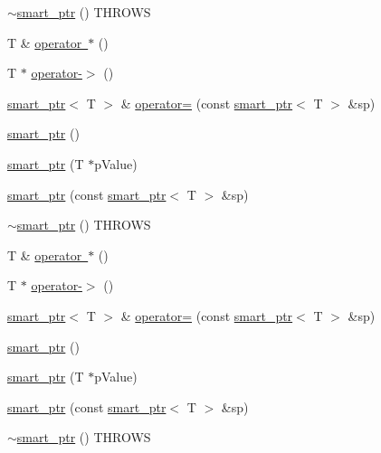 \begin{DoxyCompactItemize}
\mbox{\hyperlink{classfakeit_1_1smart__ptr_a0a184c081564a5a22d8ad0a121614bc5}{$\sim$smart\+\_\+ptr}} () T\+H\+R\+O\+WS
\item 
T \& \mbox{\hyperlink{classfakeit_1_1smart__ptr_a6ad907f45c59a2519248f5a79191992e}{operator $\ast$}} ()
\item 
T $\ast$ \mbox{\hyperlink{classfakeit_1_1smart__ptr_aa9b3019d80eee2f376a9b92ef8080ffc}{operator-\/$>$}} ()
\item 
\mbox{\hyperlink{classfakeit_1_1smart__ptr}{smart\+\_\+ptr}}$<$ T $>$ \& \mbox{\hyperlink{classfakeit_1_1smart__ptr_a76edf2172f564378c77dc88a419f6634}{operator=}} (const \mbox{\hyperlink{classfakeit_1_1smart__ptr}{smart\+\_\+ptr}}$<$ T $>$ \&sp)
\item 
\mbox{\hyperlink{classfakeit_1_1smart__ptr_ad718f001e0b0815c80d5cef4f2d4a99a}{smart\+\_\+ptr}} ()
\item 
\mbox{\hyperlink{classfakeit_1_1smart__ptr_afa05248e2dceb62a7ecc706700cfd1bf}{smart\+\_\+ptr}} (T $\ast$p\+Value)
\item 
\mbox{\hyperlink{classfakeit_1_1smart__ptr_a1157d28b4675e32ae90886871fb1b0bd}{smart\+\_\+ptr}} (const \mbox{\hyperlink{classfakeit_1_1smart__ptr}{smart\+\_\+ptr}}$<$ T $>$ \&sp)
\item 
\mbox{\hyperlink{classfakeit_1_1smart__ptr_a0a184c081564a5a22d8ad0a121614bc5}{$\sim$smart\+\_\+ptr}} () T\+H\+R\+O\+WS
\item 
T \& \mbox{\hyperlink{classfakeit_1_1smart__ptr_a6ad907f45c59a2519248f5a79191992e}{operator $\ast$}} ()
\item 
T $\ast$ \mbox{\hyperlink{classfakeit_1_1smart__ptr_aa9b3019d80eee2f376a9b92ef8080ffc}{operator-\/$>$}} ()
\item 
\mbox{\hyperlink{classfakeit_1_1smart__ptr}{smart\+\_\+ptr}}$<$ T $>$ \& \mbox{\hyperlink{classfakeit_1_1smart__ptr_a76edf2172f564378c77dc88a419f6634}{operator=}} (const \mbox{\hyperlink{classfakeit_1_1smart__ptr}{smart\+\_\+ptr}}$<$ T $>$ \&sp)
\item 
\mbox{\hyperlink{classfakeit_1_1smart__ptr_ad718f001e0b0815c80d5cef4f2d4a99a}{smart\+\_\+ptr}} ()
\item 
\mbox{\hyperlink{classfakeit_1_1smart__ptr_afa05248e2dceb62a7ecc706700cfd1bf}{smart\+\_\+ptr}} (T $\ast$p\+Value)
\item 
\mbox{\hyperlink{classfakeit_1_1smart__ptr_a1157d28b4675e32ae90886871fb1b0bd}{smart\+\_\+ptr}} (const \mbox{\hyperlink{classfakeit_1_1smart__ptr}{smart\+\_\+ptr}}$<$ T $>$ \&sp)
\item 
\mbox{\hyperlink{classfakeit_1_1smart__ptr_a0a184c081564a5a22d8ad0a121614bc5}{$\sim$smart\+\_\+ptr}} () T\+H\+R\+O\+WS

\end{DoxyCompactItemize}
